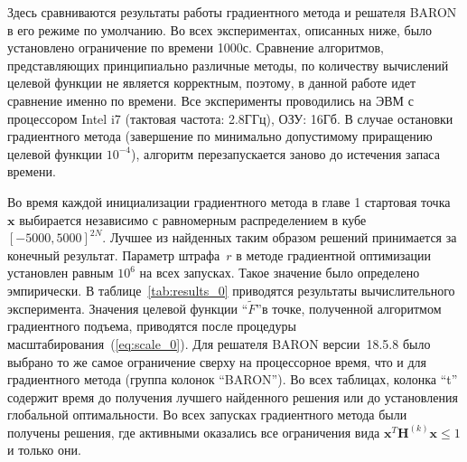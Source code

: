 Здесь сравниваются результаты работы градиентного метода и решателя BARON в его режиме по умолчанию. Во всех экспериментах, описанных ниже, было установлено ограничение по времени 1000с. Сравнение алгоритмов, представляющих принципиально различные методы, по количеству вычислений целевой функции не является корректным, поэтому, в данной работе идет сравнение именно по времени. Все эксперименты проводились на ЭВМ с процессором Intel i7 (тактовая частота: 2.8ГГц), ОЗУ: 16Гб. В случае остановки градиентного метода (завершение по минимально допустимому приращению целевой функции $10^{-4}$), алгоритм перезапускается заново до истечения запаса времени.

Во время каждой инициализации градиентного метода в главе 1 стартовая точка~$\textbf{x}$ выбирается независимо с равномерным распределением в кубе $[-5000, 5000]^{2N}$. Лучшее из найденных таким образом решений принимается за конечный результат. Параметр штрафа~$r$ в методе градиентной оптимизации установлен равным $10^6$ на всех запусках. Такое значение было определено эмпирически. В таблице~\ref{tab:results_0} приводятся результаты вычислительного эксперимента. Значения целевой функции ``$\tilde{F}$''в точке, полученной алгоритмом градиентного подъема, приводятся после процедуры масштабирования~(\ref{eq:scale_0}). Для решателя BARON версии~18.5.8 было выбрано то же самое ограничение сверху на процессорное время, что и для градиентного метода (группа колонок ``BARON''). Во всех таблицах, колонка ``t'' содержит время до получения лучшего найденного решения или до установления глобальной оптимальности. Во всех запусках градиентного метода были получены решения, где активными оказались все ограничения вида $\textbf{x}^{T}\textbf{H}^{(k)}\textbf{x} \leq 1$ и только они.


